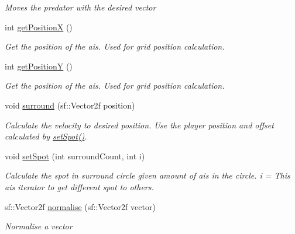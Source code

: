 \begin{DoxyCompactItemize}
\begin{DoxyCompactList}\small\item\em Moves the predator with the desired vector \end{DoxyCompactList}\item 
int \mbox{\hyperlink{class_a_i_ac91b130c717b028b2b712a6b9b29c32f}{get\+PositionX}} ()
\begin{DoxyCompactList}\small\item\em Get the position of the ais. Used for grid position calculation. \end{DoxyCompactList}\item 
int \mbox{\hyperlink{class_a_i_a3f54bcc3e90cfc46fefd0389c506720b}{get\+PositionY}} ()
\begin{DoxyCompactList}\small\item\em Get the position of the ais. Used for grid position calculation. \end{DoxyCompactList}\item 
void \mbox{\hyperlink{class_a_i_a14ec51b0b964c0e75c7c7ec2ee4829e4}{surround}} (sf\+::\+Vector2f position)
\begin{DoxyCompactList}\small\item\em Calculate the velocity to desired position. Use the player position and offset calculated by \mbox{\hyperlink{class_a_i_a128f8cf306126950c7085f582ed671c5}{set\+Spot()}}. \end{DoxyCompactList}\item 
void \mbox{\hyperlink{class_a_i_a128f8cf306126950c7085f582ed671c5}{set\+Spot}} (int surround\+Count, int i)
\begin{DoxyCompactList}\small\item\em Calculate the spot in surround circle given amount of ais in the circle. i = This ais iterator to get different spot to others. \end{DoxyCompactList}\item 
sf\+::\+Vector2f \mbox{\hyperlink{class_a_i_a80cd7b646be694678ef28cdf9d9af17e}{normalise}} (sf\+::\+Vector2f vector)
\begin{DoxyCompactList}\small\item\em Normalise a vector \end{DoxyCompactList}\end{DoxyCompactItemize}
